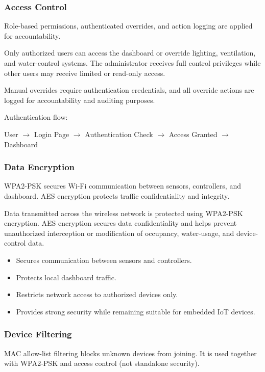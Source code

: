 \subsubsection{Access Control}
Role-based permissions, authenticated overrides, and action logging are applied for accountability.

Only authorized users can access the dashboard or override lighting, ventilation, and water-control systems. The administrator receives full control privileges while other users may receive limited or read-only access.

Manual overrides require authentication credentials, and all override actions are logged for accountability and auditing purposes.

Authentication flow:
\begin{center}
User $\rightarrow$ Login Page $\rightarrow$ Authentication Check $\rightarrow$ Access Granted $\rightarrow$ Dashboard
\end{center}

\subsubsection{Data Encryption}
WPA2-PSK secures Wi-Fi communication between sensors, controllers, and dashboard. AES encryption protects traffic confidentiality and integrity.

Data transmitted across the wireless network is protected using WPA2-PSK encryption. AES encryption secures data confidentiality and helps prevent unauthorized interception or modification of occupancy, water-usage, and device-control data.

\begin{itemize}
  \item Secures communication between sensors and controllers.
  \item Protects local dashboard traffic.
  \item Restricts network access to authorized devices only.
  \item Provides strong security while remaining suitable for embedded IoT devices.
\end{itemize}

\subsubsection{Device Filtering}
MAC allow-list filtering blocks unknown devices from joining. It is used together with WPA2-PSK and access control (not standalone security).

